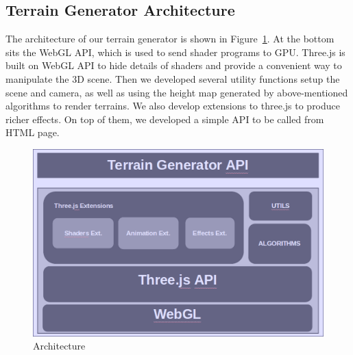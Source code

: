 \subsection{Terrain Generator Architecture}
The architecture of our terrain generator is shown in Figure~\ref{fig:arch}. At the bottom sits the WebGL API, which is used to send shader programs to GPU. Three.js is built on WebGL API to hide details of shaders and provide a convenient way to manipulate the 3D scene. Then we developed several utility functions setup the scene and camera, as well as using the height map generated by above-mentioned algorithms to render terrains. We also develop extensions to three.js to produce richer effects. On top of them, we developed a simple API to be called from HTML page.
\begin{figure}
	\center
	\includegraphics[scale=0.45]{images/arch.png}
	\caption{Architecture}
	\label{fig:arch}
\end{figure}
